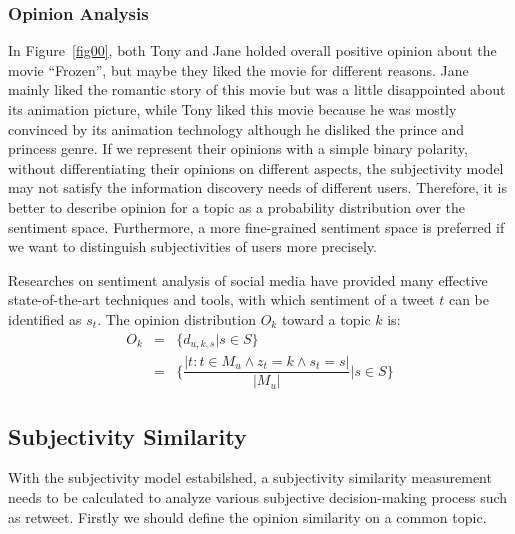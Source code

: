 \documentclass[letterpaper]{article}
\begin{document}
\subsubsection{Opinion Analysis}
\label{opinion}

In Figure~\ref{fig00}, both Tony and Jane holded overall positive opinion about the movie ``Frozen'', but maybe they liked the movie for different reasons. Jane mainly liked the romantic story of this movie but was a little disappointed about its animation picture, while Tony liked this movie because he was mostly convinced by its animation technology although he disliked the prince and princess genre. If we represent their opinions with a simple binary polarity, without differentiating their opinions on different aspects, the subjectivity model may not satisfy the information discovery needs of different users. Therefore, it is better to describe opinion for a topic as a probability distribution over the sentiment space. Furthermore, a more fine-grained sentiment space is preferred if we want to distinguish subjectivities of users more precisely.

Researches on sentiment analysis of social media have provided many effective state-of-the-art techniques and tools\cite{thelwall2010sentiment,hu2013unsupervised}, with which sentiment of a tweet $ t $ can be identified as $ s_t $. The opinion distribution $ O_k $ toward a topic $ k $ is:
\begin{eqnarray}
O_k &= & \{ d_{u,k,s}|s \in S \} \nonumber \\
  &=& \{ \dfrac{|t:t \in M_u \wedge z_t=k \wedge s_t=s|}{|M_u|}|s \in S\}
\end{eqnarray}

\subsection{Subjectivity Similarity}
\label{similarity}

With the subjectivity model estabilshed, a subjectivity similarity measurement needs to be calculated to analyze various subjective decision-making process such as retweet. 
Firstly we should define the opinion similarity on a common topic. 
 
\end{document}
